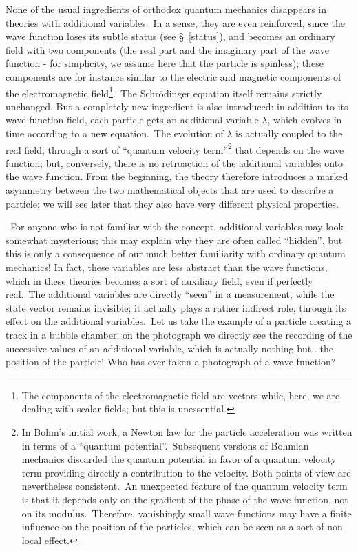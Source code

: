 \documentclass[12pt,onecolumn]{article}%
\begin{document}
None of the usual ingredients of orthodox quantum mechanics disappears in
theories with additional variables.\ In a sense, they are even reinforced,
since the wave function loses its subtle status (see \S \ \ref{status}), and
becomes an ordinary field with two components (the real part and the imaginary
part of the wave function - for simplicity, we assume here that the particle
is spinless); these components are for instance similar to the electric and
magnetic components of the electromagnetic field\footnote{The components of
the electromagnetic field are vectors while, here, we are dealing with scalar
fields; but this is unessential.}.\ The Schr\"{o}dinger equation itself
remains strictly unchanged. But a completely new ingredient is also
introduced: in addition to its wave function field, each particle gets an
additional variable $\lambda$, which evolves in time according to a new
equation.\ The evolution of $\lambda$ is actually coupled to the real field,
through a sort of ``quantum velocity term''\footnote{In Bohm's initial work, a
Newton law for the particle acceleration was written in terms of a ``quantum
potential''.\ Subsequent versions of Bohmian mechanics discarded the quantum
potential in favor of a quantum velocity term providing directly a
contribution to the velocity. Both points of view are nevertheless
consistent.\ An unexpected feature of the quantum velocity term is that it
depends only on the gradient of the phase of the wave function, not on its
modulus.\ Therefore, vanishingly small wave functions may have a finite
influence on the position of the particles, which can be seen as a sort of
non-local effect.} that depends on the wave function; but, conversely, there
is no retroaction of the additional variables onto the wave function. From the
beginning, the theory therefore introduces a marked asymmetry between the two
mathematical objects that are used to describe a particle; we will see later
that they also have very different physical properties.

\ For anyone who is not familiar with the concept, additional variables may
look somewhat mysterious; this may explain why they are often called
``hidden'', but this is only a consequence of our much better familiarity with
ordinary quantum mechanics! In fact, these variables are less abstract than
the wave functions, which in these theories becomes a sort of auxiliary field,
even if perfectly real.\ The additional variables are directly ``seen'' in a
measurement, while the state vector remains invisible; it actually plays a
rather indirect role, through its effect on the additional variables.\ Let us
take the example of a particle creating a track in a bubble chamber: on the
photograph we directly see the recording of the successive values of an
additional variable, which is actually nothing but.. the position of the
particle! Who has ever taken a photograph of a wave function?
\end{document}
